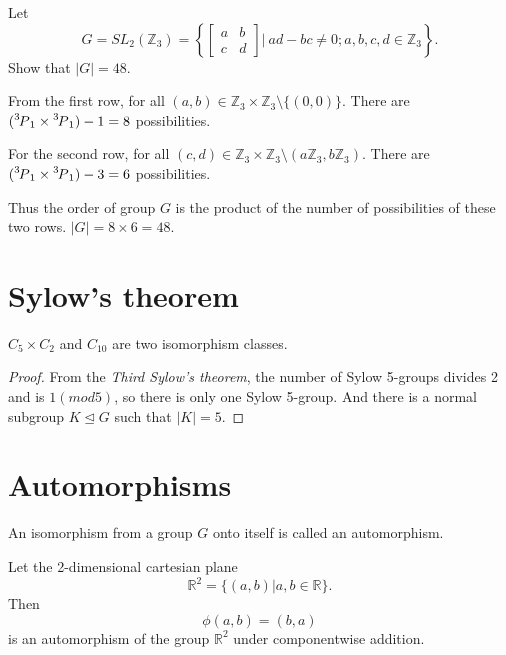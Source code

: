 \begin{example}
    Let 
    \[
        G = SL_2(\mathbb{Z}_3) = \left\{ \begin{bmatrix}
        a & b\\ c & d
        \end{bmatrix} \bigg \vert \> ad-bc \neq 0; a, b, c, d \in \mathbb{Z}_3 \right\}.
    \]
    Show that $|G| = 48$.
\end{example}
\begin{solution}
    From the first row, for all $(a,b) \in \mathbb{Z}_3 \times \mathbb{Z}_3 \setminus \{ (0,0)\}$. There are 
    $(\perm[3]{1} \times \perm[3]{1}) - 1 = 8$ possibilities.

    For the second row, for all $(c,d) \in \mathbb{Z}_3 \times \mathbb{Z}_3 \setminus (a\mathbb{Z}_3, b\mathbb{Z}_3)$.
    There are $(\perm[3]{1} \times \perm[3]{1}) - 3 = 6$ possibilities.

    Thus the order of group $G$ is the product of the number of possibilities of these two rows. $|G| = 8 \times 6 = 48$.
\end{solution}

\section{Sylow's theorem}

\begin{theorem}
    $C_5 \times C_2$ and $C_{10}$ are two isomorphism classes.
\end{theorem}
\begin{proof}
    From the \textit{Third Sylow's theorem}, the number of Sylow 5-groups divides 2 and is $1 (mod 5)$, so there is only one Sylow 5-group.
    And there is a normal subgroup $K \trianglelefteq G$ such that $|K| = 5$.
\end{proof}

\section{Automorphisms}

\begin{definition}
    An isomorphism from a group $G$ onto itself is called an automorphism.
\end{definition}

\begin{example}
    Let the 2-dimensional cartesian plane
    \[
        \mathbb{R}^2 = \{ (a,b) | a, b \in \mathbb{R} \}.
    \]
    Then
    \[
        \phi(a,b) = (b,a)
    \]
    is an automorphism of the group $\mathbb{R}^2$ under componentwise addition.
\end{example}

